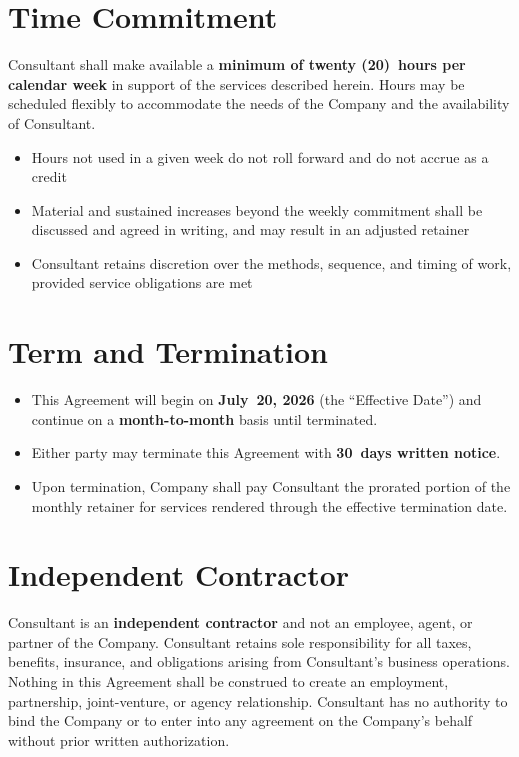 \documentclass{toospoint}
\begin{document}
\section{Time Commitment}

Consultant shall make available a \textbf{minimum of twenty (20)~hours per
calendar week} in support of the services described herein. Hours may be
scheduled flexibly to accommodate the needs of the Company and the availability
of Consultant.

\begin{itemize}[leftmargin=1.5em, itemsep=4pt, topsep=4pt]
  \item Hours not used in a given week do not roll forward and do not accrue as a credit
  \item Material and sustained increases beyond the weekly commitment shall be discussed and agreed in writing, and may result in an adjusted retainer
  \item Consultant retains discretion over the methods, sequence, and timing of work, provided service obligations are met
\end{itemize}

\section{Term and Termination}

\begin{itemize}[leftmargin=1.5em, itemsep=4pt, topsep=4pt]
  \item This Agreement will begin on \textbf{July~20, 2026} (the ``Effective Date'') and continue on a \textbf{month-to-month} basis until terminated.
  \item Either party may terminate this Agreement with \textbf{30~days written notice}.
  \item Upon termination, Company shall pay Consultant the prorated portion of the monthly retainer for services rendered through the effective termination date.
\end{itemize}

\section{Independent Contractor}

Consultant is an \textbf{independent contractor} and not an employee, agent, or
partner of the Company. Consultant retains sole responsibility for all taxes,
benefits, insurance, and obligations arising from Consultant's business
operations. Nothing in this Agreement shall be construed to create an
employment, partnership, joint-venture, or agency relationship. Consultant has
no authority to bind the Company or to enter into any agreement on the
Company's behalf without prior written authorization.
\end{document}
